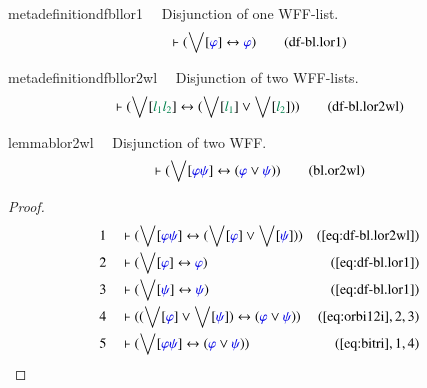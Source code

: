 \begin{restatable}{metadefinition}{dfbllor1}~~ Disjunction of one WFF-list.
\begin{align}
\vdash ( \bigvee[ \mw{\varphi} ] \leftrightarrow \mw{\varphi}
    )\label{eq:df-bl.lor1}\tag{df-bl.lor1}
\end{align}
\end{restatable}

\begin{restatable}{metadefinition}{dfbllor2wl}~~ Disjunction of two WFF-lists.
\begin{align}
\vdash ( \bigvee[ \mwl{l_1} \mwl{l_2} ] \leftrightarrow ( \bigvee[ \mwl{l_1} ]
    \vee \bigvee[ \mwl{l_2} ] ) )\label{eq:df-bl.lor2wl}\tag{df-bl.lor2wl}
\end{align}
\end{restatable}

\begin{restatable}{lemma}{blor2wl}~~ Disjunction of two WFF.
\begin{align}
\vdash ( \bigvee[ \mw{\varphi} \mw{\psi} ] \leftrightarrow ( \mw{\varphi} \vee
    \mw{\psi} ) )\label{eq:bl.or2wl}\tag{bl.or2wl}
\end{align}
\end{restatable}

\begin{proof}
\begin{align}
  1 &&  & \vdash ( \bigvee[ \mw{\varphi} \mw{\psi} ] \leftrightarrow ( \bigvee[
      \mw{\varphi} ] \vee \bigvee[ \mw{\psi} ] )
      )&(\mbox{\ref{eq:df-bl.lor2wl}})\notag
  \\ 2 &&  & \vdash ( \bigvee[ \mw{\varphi} ] \leftrightarrow \mw{\varphi}
      )&(\mbox{\ref{eq:df-bl.lor1}})\notag
  \\ 3 &&  & \vdash ( \bigvee[ \mw{\psi} ] \leftrightarrow \mw{\psi}
      )&(\mbox{\ref{eq:df-bl.lor1}})\notag
  \\ 4 &&  & \vdash ( ( \bigvee[ \mw{\varphi} ] \vee \bigvee[ \mw{\psi} ] )
      \leftrightarrow ( \mw{\varphi} \vee \mw{\psi} )
      )&(\mbox{\ref{eq:orbi12i}},2,3)\notag
  \\ 5 &&  & \vdash ( \bigvee[ \mw{\varphi} \mw{\psi} ] \leftrightarrow (
      \mw{\varphi} \vee \mw{\psi} )
      )&(\mbox{\ref{eq:bitri}},1,4)\notag
\end{align}
\end{proof}

